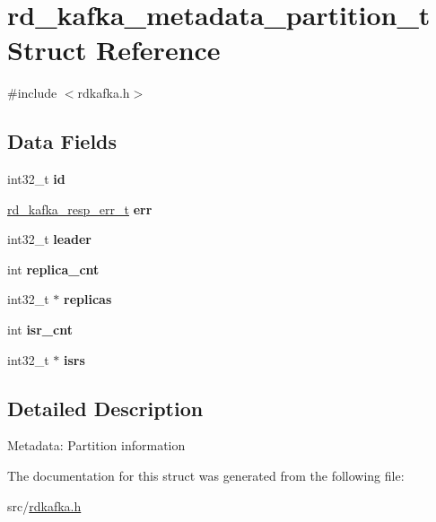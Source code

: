 \hypertarget{structrd__kafka__metadata__partition__t}{\section{rd\-\_\-kafka\-\_\-metadata\-\_\-partition\-\_\-t Struct Reference}
\label{structrd__kafka__metadata__partition__t}
}


{\ttfamily \#include $<$rdkafka.\-h$>$}

\subsection*{Data Fields}
\begin{DoxyCompactItemize}
\item 
\hypertarget{structrd__kafka__metadata__partition__t_ad76c23a795a752dfdea2ca69236e7f29}{int32\-\_\-t {\bfseries id}}\label{structrd__kafka__metadata__partition__t_ad76c23a795a752dfdea2ca69236e7f29}

\item 
\hypertarget{structrd__kafka__metadata__partition__t_abc667de1e28c6be4aece698806ca6e09}{\hyperlink{rdkafka_8h_a03509bab51072c72a8dcf52337e6d5cb}{rd\-\_\-kafka\-\_\-resp\-\_\-err\-\_\-t} {\bfseries err}}\label{structrd__kafka__metadata__partition__t_abc667de1e28c6be4aece698806ca6e09}

\item 
\hypertarget{structrd__kafka__metadata__partition__t_a6c068b9f40bae19de020ce0c8cfc8053}{int32\-\_\-t {\bfseries leader}}\label{structrd__kafka__metadata__partition__t_a6c068b9f40bae19de020ce0c8cfc8053}

\item 
\hypertarget{structrd__kafka__metadata__partition__t_a999ac89d23012cfc5ba8acc351300506}{int {\bfseries replica\-\_\-cnt}}\label{structrd__kafka__metadata__partition__t_a999ac89d23012cfc5ba8acc351300506}

\item 
\hypertarget{structrd__kafka__metadata__partition__t_ae06053cbbeb9bdcf324606cf19a00e7f}{int32\-\_\-t $\ast$ {\bfseries replicas}}\label{structrd__kafka__metadata__partition__t_ae06053cbbeb9bdcf324606cf19a00e7f}

\item 
\hypertarget{structrd__kafka__metadata__partition__t_ac49c0e74551f6398bfa04245b49230d8}{int {\bfseries isr\-\_\-cnt}}\label{structrd__kafka__metadata__partition__t_ac49c0e74551f6398bfa04245b49230d8}

\item 
\hypertarget{structrd__kafka__metadata__partition__t_a82d9888272c26a78836f12827ffc1a64}{int32\-\_\-t $\ast$ {\bfseries isrs}}\label{structrd__kafka__metadata__partition__t_a82d9888272c26a78836f12827ffc1a64}

\end{DoxyCompactItemize}


\subsection{Detailed Description}
Metadata\-: Partition information 

The documentation for this struct was generated from the following file\-:\begin{DoxyCompactItemize}
\item 
src/\hyperlink{rdkafka_8h}{rdkafka.\-h}\end{DoxyCompactItemize}
